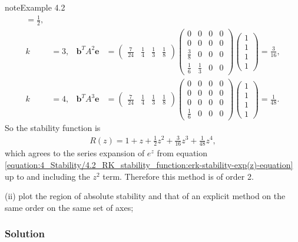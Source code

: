 \documentclass[letterpaper,10pt,english]{jupyterBook}
\begin{document}
\begin{sphinxadmonition}{note}{Example 4.2}
\begin{align*}
    = \frac{1}{2}, \\
    k &= 3, & \mathbf{b}^TA^2 \mathbf{e} &= 
    \begin{pmatrix} \frac{7}{24} & \frac{1}{4} & \frac{1}{3} & \frac{1}{8} \end{pmatrix}
    \begin{pmatrix}
        0 & 0 & 0 & 0 \\
        0 & 0 & 0 & 0 \\
        \frac{3}{8} & 0 & 0 & 0 \\
        \frac{1}{6} & \frac{1}{3} & 0 & 0
    \end{pmatrix}
    \begin{pmatrix} 1 \\ 1 \\ 1 \\ 1 \end{pmatrix} 
    = \frac{3}{16}, \\
    k &= 4, & \mathbf{b}^TA^3 \mathbf{e} &= 
    \begin{pmatrix} \frac{7}{24} & \frac{1}{4} & \frac{1}{3} & \frac{1}{8} \end{pmatrix}
    \begin{pmatrix}
        0 & 0 & 0 & 0 \\
        0 & 0 & 0 & 0 \\
        0 & 0 & 0 & 0 \\
        \frac{1}{6} & 0 & 0 & 0
    \end{pmatrix}
    \begin{pmatrix} 1 \\ 1 \\ 1 \\ 1 \end{pmatrix} 
    = \frac{1}{48}.
\end{align*}
\sphinxAtStartPar
So the stability function is
\begin{align*}
    R(z) = 1 + z + \frac{1}{2} z^2 + \frac{3}{16} z^3 + \frac{1}{48} z^4,
\end{align*}
\sphinxAtStartPar
which agrees to the series expansion of \(e^z\) from equation \eqref{equation:4_Stability/4.2_RK_stability_function:erk-stability-exp(z)-equation} up to and including the \(z^2\) term. Therefore this method is of order 2.

\sphinxAtStartPar
(ii) plot the region of absolute stability and that of an explicit method on the same order on the same set of axes;
\subsubsection*{Solution}


\end{sphinxadmonition}
\end{document}

